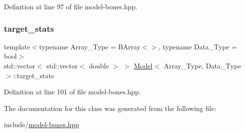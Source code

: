 Definition at line 97 of file model-\/bones.\+hpp.

\mbox{\label{class_model_ab0f4642a2d4602fabb6774914b7dbd39}} 
\subsubsection{\texorpdfstring{target\+\_\+stats}{target\_stats}}
{\footnotesize\ttfamily template$<$typename Array\+\_\+\+Type  = B\+Array$<$$>$, typename Data\+\_\+\+Type  = bool$>$ \\
std\+::vector$<$ std\+::vector$<$ double $>$ $>$ \hyperlink{class_model}{Model}$<$ Array\+\_\+\+Type, Data\+\_\+\+Type $>$\+::target\+\_\+stats}



Definition at line 101 of file model-\/bones.\+hpp.



The documentation for this class was generated from the following file\+:\begin{DoxyCompactItemize}
\item 
include/\hyperlink{model-bones_8hpp}{model-\/bones.\+hpp}\end{DoxyCompactItemize}

